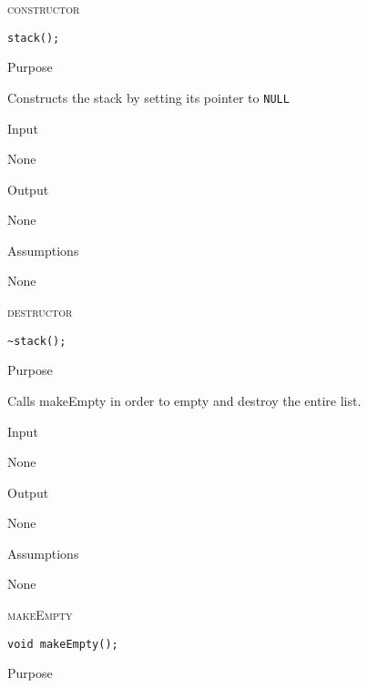 \documentclass[pdftex, 11pt]{article}
\begin{document}
\begin{description}

	\item{\textsc{constructor}}

		\begin{lstlisting}
stack();
		\end{lstlisting}

		\begin{description}
			\item{Purpose}
				
				Constructs the stack by setting its pointer
				to \texttt{NULL}

			\item{Input}

				None

			\item{Output}
				
				None

			\item{Assumptions}

				None

		\end{description}


	\item{\textsc{destructor}}

		\begin{lstlisting}
~stack();
		\end{lstlisting}

		\begin{description}
			\item{Purpose}
				
				Calls makeEmpty in order to empty and destroy
				the entire list.

			\item{Input}

				None

			\item{Output}
				
				None

			\item{Assumptions}

				None

		\end{description}
	\item{\textsc{makeEmpty}}

		\begin{lstlisting}
void makeEmpty();
		\end{lstlisting}

		\begin{description}
			\item{Purpose}
				

\end{description}
\end{description}
\end{document}
